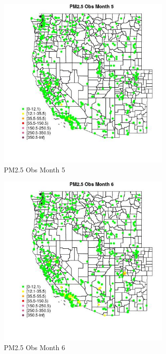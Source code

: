 \begin{figure} 
\centering  
\includegraphics[width=0.77\textwidth]{Code_Outputs/Report_ML_input_PM25_Step4_part_e_de_duplicated_aves_compiled_2019-05-14wNAs_MapObsMo5PM25_Obs.jpg} 
\caption{\label{fig:Report_ML_input_PM25_Step4_part_e_de_duplicated_aves_compiled_2019-05-14wNAsMapObsMo5PM25_Obs}PM2.5 Obs Month 5} 
\end{figure} 
 

\begin{figure} 
\centering  
\includegraphics[width=0.77\textwidth]{Code_Outputs/Report_ML_input_PM25_Step4_part_e_de_duplicated_aves_compiled_2019-05-14wNAs_MapObsMo6PM25_Obs.jpg} 
\caption{\label{fig:Report_ML_input_PM25_Step4_part_e_de_duplicated_aves_compiled_2019-05-14wNAsMapObsMo6PM25_Obs}PM2.5 Obs Month 6} 
\end{figure} 
 


